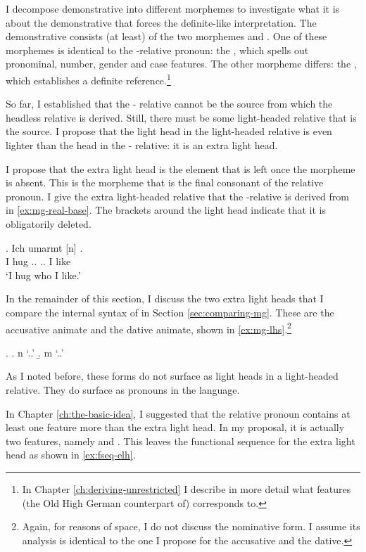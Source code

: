 I decompose demonstrative  into different morphemes to investigate what it is about the demonstrative that forces the definite-like interpretation. The demonstrative consists (at least) of the two morphemes  and . One of these morphemes is identical to the -relative pronoun: the , which spells out pronominal, number, gender and case features. The other morpheme differs: the , which establishes a definite reference.\footnote{
In Chapter \ref{ch:deriving-unrestricted} I describe in more detail what features (the Old High German counterpart of)  corresponds to.
}

So far, I established that the - relative cannot be the source from which the headless relative is derived. Still, there must be some light-headed relative that is the source. I propose that the light head in the light-headed relative is even lighter than the head in the - relative: it is an extra light head.

I propose that the extra light head is the element that is left once the morpheme  is absent. This is the morpheme that is the final consonant of the relative pronoun. I give the extra light-headed relative that the -relative is derived from in \ref{ex:mg-real-base}. The brackets around the light head indicate that it is obligatorily deleted.

\exg. Ich umarmt [n]   .\\
I hug .. .. I like\\
`I hug who I like.'\label{ex:mg-real-base}

In the remainder of this section, I discuss the two extra light heads that I compare the internal syntax of in Section \ref{sec:comparing-mg}. These are the accusative animate and the dative animate, shown in \ref{ex:mg-lhs}.\footnote{
Again, for reasons of space, I do not discuss the nominative form. I assume its analysis is identical to the one I propose for the accusative and the dative.
}

\ex.\label{ex:mg-lhs}
\a. n `..'
\b. m `..'

As I noted before, these forms do not surface as light heads in a light-headed relative. They do surface as pronouns in the language.

In Chapter \ref{ch:the-basic-idea}, I suggested that the relative pronoun contains at least one feature more than the extra light head. In my proposal, it is actually two features, namely  and . This leaves the functional sequence for the extra light head as shown in \ref{ex:fseq-elh}.

